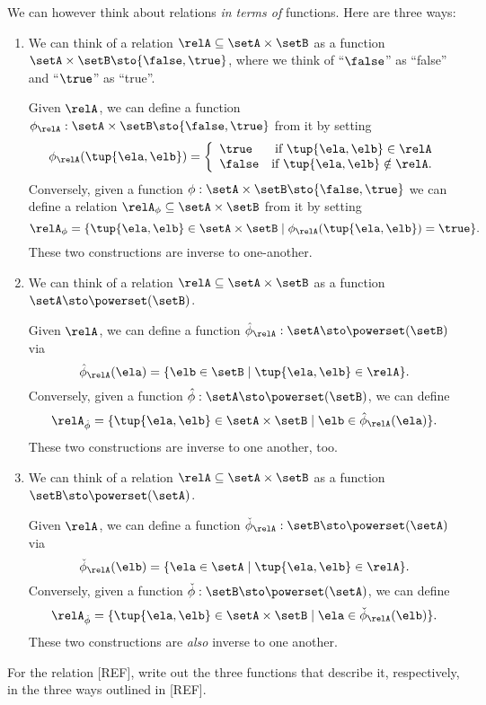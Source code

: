 We can however think about relations \emph{in terms of} functions. Here are three ways: 
\begin{enumerate}
\item We can think of a relation $\relA \subseteq \setA \times \setB$ as a function $\setA \times \setB \sto \{ \false, \true \}$, where we think of ``$\false$'' as ``false'' and ``$\true$'' as ``true''. 

Given $\relA$, we can define a function $\phi_{\relA} : \setA \times \setB \sto \{ \false, \true \}$ from it by setting 
\begin{equation}
\phi_{\relA}(\tup{\ela, \elb}) = 
\left 
\{\begin{array}{lr}
        \true & \text{if } \tup{\ela, \elb} \in \relA \\
        \false & \text{if } \tup{\ela, \elb} \notin \relA.
        \end{array}
\right. 
\end{equation}
Conversely, given a function $\phi: \setA \times \setB \sto \{ \false, \true \}$ we can define a relation $\relA_{\phi} \subseteq \setA \times \setB$ from it by setting 
\begin{equation}
\relA_{\phi} = \{ \tup{\ela, \elb} \in \setA \times \setB \mid \phi_{\relA}(\tup{\ela, \elb}) = \true \}.
\end{equation}
These two constructions are inverse to one-another. 

\item We can think of a relation $\relA \subseteq \setA \times \setB$ as a function $\setA  \sto \powerset (\setB)$. 

Given $\relA$, we can define a function $\hat \phi_{\relA} : \setA \sto \powerset (\setB)$ via 
\begin{equation}
\hat \phi_{\relA} (\ela) = \{ \elb \in \setB \mid \tup{\ela, \elb} \in \relA \}. 
\end{equation}
Conversely, given a function $\hat \phi : \setA \sto \powerset (\setB)$, we can define 
\begin{equation}
\relA_{\hat \phi} = \{ \tup{\ela, \elb} \in \setA \times \setB \mid \elb \in \hat \phi_{\relA}(\ela)   \}.
\end{equation}
These two constructions are inverse to one another, too. 

\item We can think of a relation $\relA \subseteq \setA \times \setB$ as a function $\setB  \sto \powerset (\setA)$. 

Given $\relA$, we can define a function $\check \phi_{\relA} : \setB \sto \powerset (\setA)$ via 
\begin{equation}
\check \phi_{\relA} (\elb) = \{ \ela \in \setA \mid \tup{\ela, \elb} \in \relA \}. 
\end{equation}
Conversely, given a function $\check \phi : \setB \sto \powerset (\setA)$, we can define 
\begin{equation}
\relA_{\check \phi} = \{ \tup{\ela, \elb} \in \setA \times \setB \mid \ela \in \check \phi_{\relA}(\elb)   \}.
\end{equation}
These two constructions are \emph{also} inverse to one another. 

\end{enumerate}

\begin{gradedexercise}
For the relation [REF], write out the three functions that describe it, respectively, in the three ways outlined in [REF]. 
\end{gradedexercise}
